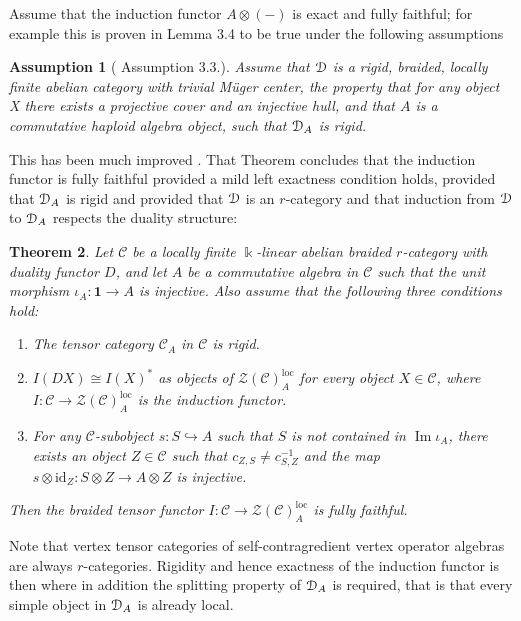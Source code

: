 \documentclass[a4paper, reqno]{amsart}
\newtheorem{theorem}{Theorem}[section]
\newtheorem{assumption}[theorem]{Assumption}
\theoremstyle{introTheorems}
\renewcommand{\1}{\mathbbold{1}}
\begin{document}
Assume that the induction functor $A\otimes (-)$ is exact and fully faithful; for example this is proven in  \cite{CLR23} Lemma 3.4
 to be true under the following assumptions
\begin{assumption}[\cite{CLR23} Assumption 3.3.]\label{assumption_Fullyfaithful}
Assume that $\mathcal{D}$ is a rigid, braided, locally finite abelian category with
trivial M\"uger center, the property that for any object X there exists a projective cover and an injective hull, and that $A$ is a commutative haploid algebra object, such that $\mathcal{D}_A$ is rigid.
\end{assumption}
This has been much improved \cite[Theorem 3.20]{CMSY24}. That Theorem concludes that the induction functor is fully faithful provided a mild left exactness condition holds, provided that $\mathcal{D}_A$ is rigid and provided that $\mathcal{D}$ is an $r$-category and that induction from $\mathcal{D}$ to $\mathcal{D}_A$ respects the duality structure:
\begin{theorem}\textup{\cite[Theorem 3.20]{CMSY24}}
Let $\mathcal{C}$ be a locally finite $\Bbbk$-linear abelian braided
$r$-category with duality functor $D$, and let $A$ be a commutative
algebra in $\mathcal{C}$ such that the unit morphism
$\iota_A \colon \mathbf{1} \to A$ is injective. Also assume that the
following three conditions hold:
\begin{enumerate}
\item[(a)] The tensor category $\mathcal{C}_A$ 
in $\mathcal{C}$ is rigid.
\item[(b)] $I(DX) \cong I(X)^{*}$ as objects of
$\mathcal{Z}(\mathcal{C})^{\mathrm{loc}}_{A}$ for every object
$X \in \mathcal{C}$, where $I \colon \mathcal{C} \to
\mathcal{Z}(\mathcal{C})^{\mathrm{loc}}_{A}$ is the induction
functor.
\item[(c)] For any $\mathcal{C}$-subobject $s \colon S \hookrightarrow A$
such that $S$ is not contained in $\operatorname{Im}\iota_A$, there
exists an object $Z \in \mathcal{C}$ such that
$c_{Z,S} \neq c_{S,Z}^{-1}$ and the map
$s \otimes \mathrm{id}_Z \colon S \otimes Z \to A \otimes Z$ is
injective.
\end{enumerate}
Then the braided tensor functor
$I \colon \mathcal{C} \to \mathcal{Z}(\mathcal{C})^{\mathrm{loc}}_{A}$
is fully faithful.
\end{theorem}

Note that vertex tensor categories of self-contragredient vertex operator algebras are always $r$-categories. Rigidity and hence exactness of the induction functor is then
\cite[Theorem 3.21]{CMSY24} where in addition the splitting property of $\mathcal{D}_A$ is required, that is that every simple object in $\mathcal{D}_A$ is already local. 
\end{document}
